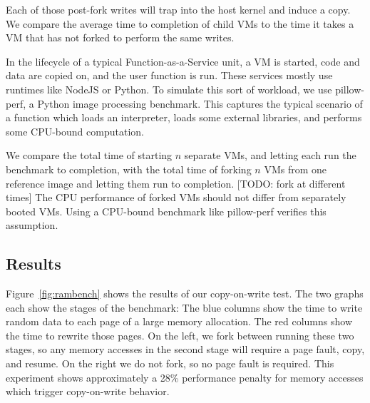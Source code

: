 Each of those post-fork writes will trap into the host kernel and induce a
copy. We compare the average time to completion of child VMs to the time it
takes a VM that has not forked to perform the same writes.

In the lifecycle of a typical Function-as-a-Service unit, a VM is started, code
and data are copied on, and the user function is run. These services mostly use
runtimes like NodeJS or Python. To simulate this sort of workload, we use
pillow-perf, a Python image processing benchmark. This captures the typical
scenario of a function which loads an interpreter, loads some external
libraries, and performs some CPU-bound computation.

We compare the total time of starting $n$ separate VMs, and letting each run
the benchmark to completion, with the total time of forking $n$ VMs from one
reference image and letting them run to completion. [TODO: fork at different
times] The CPU performance of forked VMs should not differ from separately
booted VMs. Using a CPU-bound benchmark like pillow-perf verifies this
assumption.

\subsection{Results}

Figure~\ref{fig:rambench} shows the results of our copy-on-write test. The two
graphs each show the stages of the benchmark: The blue columns show the time to
write random data to each page of a large memory allocation. The red columns
show the time to rewrite those pages. On the left, we fork between running
these two stages, so any memory accesses in the second stage will require a
page fault, copy, and resume. On the right we do not fork, so no page fault is
required. This experiment shows approximately a 28\% performance penalty for
memory accesses which trigger copy-on-write behavior.

%
